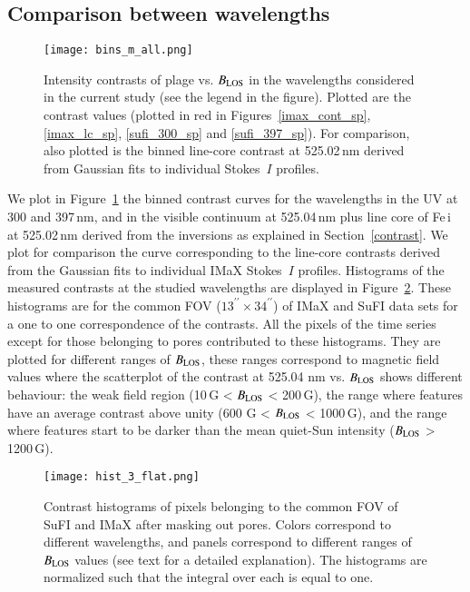 \documentclass[goettingen, gauss, print]{thesis}
\begin{document}
\subsection{Comparison between wavelengths}
\label{all_wav}

\begin{figure*}
\centering
\texttt{[image: bins\_m\_all.png]}
\caption{Intensity contrasts of plage vs. $B_{\rm LOS}$ in the wavelengths considered in the current study (see the legend in the figure). Plotted are the contrast values (plotted in red in Figures~\ref{imax_cont_sp}, \ref{imax_lc_sp}, \ref{sufi_300_sp} and \ref{sufi_397_sp}). For comparison, also plotted is the binned line-core contrast at 525.02\,nm derived from Gaussian fits to individual Stokes~$I$ profiles.}
\label{all}
\end{figure*}


We plot in Figure~\ref{all} the binned contrast curves for the wavelengths in the UV at 300 and 397\,nm, and in the visible continuum at 525.04\,nm plus line core of Fe\,{\sc i} at 525.02\,nm derived from the inversions as explained in Section~\ref{contrast}. We plot for comparison the curve corresponding to the line-core contrasts derived from the Gaussian fits to individual IMaX Stokes~$I$ profiles. 
Histograms of the measured contrasts at the studied wavelengths are displayed in Figure~\ref{hist}. These histograms are for the common FOV ($13^{\prime\prime}\times34^{\prime\prime}$) of IMaX and SuFI data sets for a one to one correspondence of the contrasts. All the pixels of the time series except for those belonging to pores   contributed to these histograms. They are plotted for different ranges of $B_{\rm LOS}$, these ranges correspond to magnetic field values where the scatterplot of the contrast at 525.04 nm vs. $B_{\rm LOS}$ shows different behaviour: the weak field region (10\,G < $B_{\rm LOS}$ < 200\,G), the range where features have an average contrast above unity (600 G < $B_{\rm LOS}$ < 1000\,G), and the range where features start to be darker than the mean quiet-Sun intensity ($B_{\rm LOS}$ > 1200\,G).


\begin{figure*}[ht!]
\centering
\hspace*{-2.5cm}\texttt{[image: hist\_3\_flat.png]}
\caption{Contrast histograms of pixels belonging to the common FOV of SuFI and IMaX after masking out pores. Colors correspond to different wavelengths, and panels correspond to different ranges of $B_{\rm LOS}$ values (see text for a detailed explanation). The histograms are normalized such that the integral over each is equal to one.  }
\label{hist}
\end{figure*}
 
\end{document}
